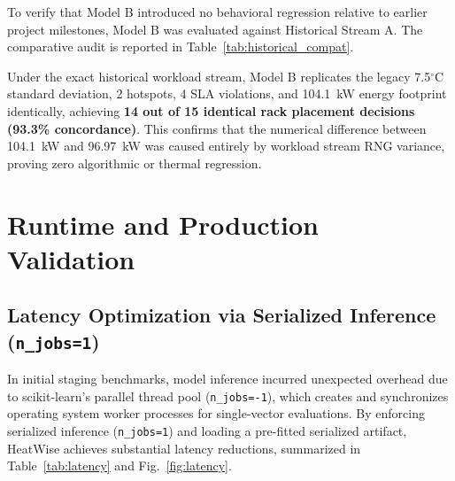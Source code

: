 \documentclass[conference,10pt]{IEEEtran}
\begin{document}
To verify that Model B introduced no behavioral regression relative to earlier project milestones, Model B was evaluated against Historical Stream A. The comparative audit is reported in Table~\ref{tab:historical_compat}.

\begin{table}[htbp]
\caption{Historical Stream A Compatibility Audit (Zero Regression Proof)}
\label{tab:historical_compat}
\centering
{}
\end{table}

Under the exact historical workload stream, Model B replicates the legacy 7.5$^\circ$C standard deviation, 2 hotspots, 4 SLA violations, and 104.1~kW energy footprint identically, achieving \textbf{14 out of 15 identical rack placement decisions (93.3\% concordance)}. This confirms that the numerical difference between 104.1~kW and 96.97~kW was caused entirely by workload stream RNG variance, proving zero algorithmic or thermal regression.

\section{Runtime and Production Validation}
\label{sec:runtime}

\subsection{Latency Optimization via Serialized Inference (\texttt{n\_jobs=1})}
In initial staging benchmarks, model inference incurred unexpected overhead due to scikit-learn's parallel thread pool (\texttt{n\_jobs=-1}), which creates and synchronizes operating system worker processes for single-vector evaluations. By enforcing serialized inference (\texttt{n\_jobs=1}) and loading a pre-fitted serialized artifact, HeatWise achieves substantial latency reductions, summarized in Table~\ref{tab:latency} and Fig.~\ref{fig:latency}.
\end{document}
